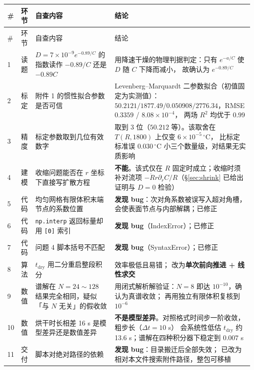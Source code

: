 \documentclass[11pt,a4paper]{article}
\theoremstyle{definition}
\begin{document}
\begin{center}
\small
\begin{longtable}{@{}p{0.6cm}p{1.6cm}p{6.0cm}p{6.4cm}@{}}
\toprule
\# & 环节 & 自查内容 & 结论 \\
\midrule
\endfirsthead
\toprule
\# & 环节 & 自查内容 & 结论 \\
\midrule
\endhead
1 & 读题 & $D=7\times10^{-9}e^{-0.89/C}$ 的指数读作 $-0.89/C$ 还是 $-0.89C$ &
用降速干燥的物理判据判定：只有 $e^{-a/C}$ 使 $D$ 随 $C$ 下降而减小，
故确认为 $e^{-0.89/C}$ \\
2 & 标定 & 附件 1 的惯性拟合参数是否可信 &
Levenberg--Marquardt 二参数拟合（初值固定为实测值）：
$50.2121/1877.49/0.050908/2776.34$，RMSE $0.3359$ / $8.08\times10^{-4}$，
两场 $R^2$ 均优于 $0.99$ \\
3 & 精度 & 标定参数取到几位有效数字 &
取到 3 位（$50.212$ 等）。该取舍在 $T(R,1800)$ 上仅变 $6\times10^{-5}\,^\circ$C，
比标定标准误 $0.030\,^\circ$C 小三个数量级，对结果无实质影响 \\
4 & 建模 & 收缩问题能否在 $r$ 坐标下直接写扩散方程 &
\textbf{不能}。该式仅在 $R$ 固定时成立；收缩时须补对流项
$-\dot Rr\partial_rC/R$（\S\ref{sec:shrink} 已给出证明与 $D=0$ 检验）\\
5 & 代码 & 均匀网格有限体积末端节点的系数位置 &
\textbf{发现 bug}：次对角系数被误写入超对角槽，会使表面节点与内部解耦；已修正 \\
6 & 代码 & \texttt{np.interp} 返回标量却用 \texttt{[0]} 索引 & \textbf{发现 bug}（IndexError）；已修正 \\
7 & 代码 & 问题 4 脚本括号不匹配 & \textbf{发现 bug}（SyntaxError）；已修正 \\
8 & 算法 & $t_{\text{dry}}$ 用二分重启整段积分 & 效率极低且易错；
改为\textbf{单次前向推进 + 线性求交} \\
9 & 数值 & 谱解在 $N=24\sim128$ 结果完全相同，疑似「与 $N$ 无关」的假收敛 &
用闭式解析解验证：$N=8$ 即达 $10^{-10}$，确认为真谱收敛；
再用独立有限体积复核到 $10^{-6}$ \\
10 & 数值 & 烘干时长相差 16 s 是模型差异还是数值差异 &
\textbf{不是模型差异}。对照格式时间步一阶收敛，粗步长（$\Delta t=10$ s）
会系统性低估 $t_{\text{dry}}$ 约 13.6 s；谱解在四种积分器下稳定到 $0.007$ s \\
11 & 交付 & 脚本对绝对路径的依赖 & \textbf{发现 bug}：目录搬迁后全部失效；
已改为相对本文件搜索附件路径，整包可移植 \\
\bottomrule
\end{longtable}
\end{center}
\end{document}
